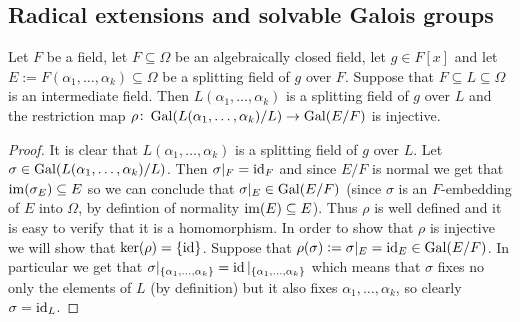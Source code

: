 \documentclass[11pt,a4paper]{article}
\begin{document}
\subsection{Radical extensions and solvable Galois groups}
\begin{lemma}
  Let $F$ be a field, let $F \subseteq \Omega$ be an algebraically
  closed field, let $g \in F[x]$ and let
  $E := F(\alpha_1,\dots,\alpha_k) \subseteq \Omega$ be a splitting
  field of $g$ over $F$.
  Suppose that $F \subseteq L \subseteq \Omega$ is an intermediate field.
  Then $L(\alpha_1,\dots,\alpha_k)$ is a splitting field of $g$ over $L$
  and the restriction map
  $\rho \colon \operatorname{Gal}(L(\alpha_1,\dots,\alpha_k)/L) \to \operatorname{Gal}(E/F)$
  is injective.
\end{lemma}
\begin{proof}
  It is clear that $L(\alpha_1,\dots,\alpha_k)$ is a splitting field
  of $g$ over $L$.
  Let $\sigma \in \operatorname{Gal}(L(\alpha_1,\dots,\alpha_k)/L)$.
  Then $\sigma\vert_F = \operatorname{id}_F$ and since $E/F$ is normal we get
  that $\operatorname{im}(\sigma_E) \subseteq E$
  so we can conclude that $\sigma\vert_E \in \operatorname{Gal}(E/F)$
  (since $\sigma$ is an $F$-embedding of $E$ into $\Omega$,
  by defintion of normality $\operatorname{im}(E) \subseteq E$).
  Thus $\rho$ is well defined and it is easy to verify that
  it is a homomorphism.
  In order to show that $\rho$ is injective we will show that
  $\ker(\rho) = \left\{\operatorname{id}\right\}$.
  Suppose that $\rho(\sigma) := \sigma\vert_E = \operatorname{id}_E \in \operatorname{Gal}(E/F)$. 
  In particular we get that
  $\sigma\vert_{\left\{\alpha_1,\dots,\alpha_k\right\}} =
  \operatorname{id}\vert_{\left\{\alpha_1,\dots,\alpha_k\right\}}$
  which means that $\sigma$ fixes no only the elements of $L$ (by definition)
  but it also fixes $\alpha_1,\dots,\alpha_k$,
  so clearly $\sigma = \operatorname{id}_L$.
\end{proof}
\end{document}
